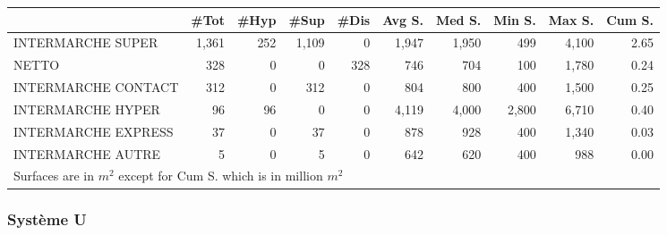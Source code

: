 \documentclass[11pt]{article}
\begin{document}
\begin{table}[H]
\footnotesize
\setlength{\tabcolsep}{2pt}

\begin{tabular}{lrrrrrrrrr}
\toprule
\toprule
{} &       \#Tot &       \#Hyp &       \#Sup &       \#Dis &     Avg S. &     Med S. &     Min S. &     Max S. &     Cum S. \\
\midrule
INTERMARCHE SUPER   &      1,361 &        252 &      1,109 &          0 &      1,947 &      1,950 &        499 &      4,100 &       2.65 \\
NETTO               &        328 &          0 &          0 &        328 &        746 &        704 &        100 &      1,780 &       0.24 \\
INTERMARCHE CONTACT &        312 &          0 &        312 &          0 &        804 &        800 &        400 &      1,500 &       0.25 \\
INTERMARCHE HYPER   &         96 &         96 &          0 &          0 &      4,119 &      4,000 &      2,800 &      6,710 &       0.40 \\
INTERMARCHE EXPRESS &         37 &          0 &         37 &          0 &        878 &        928 &        400 &      1,340 &       0.03 \\
INTERMARCHE AUTRE   &          5 &          0 &          5 &          0 &        642 &        620 &        400 &        988 &       0.00 \\
\bottomrule
\multicolumn{10}{l}{\footnotesize Surfaces are in $m^2$ except for Cum S. which is in million $m^2$} \\
\end{tabular}

\end{table}

\subsubsection{Système U}
\end{document}
